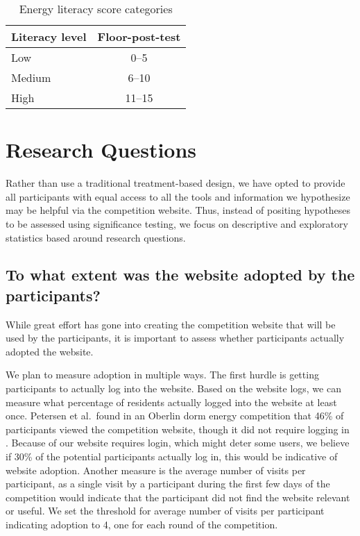 \begin{table}[htbp]
	\centering
		\begin{tabular}{| l | c |}
			\hline
			Literacy level & Floor-post-test \\ \hline
				
			Low & 0--5 \\ \hline

			Medium & 6--10 \\ \hline

			High & 11--15 \\ \hline

		\end{tabular}
	\caption{Energy literacy score categories}
	\label{tab:literacy-categories}
\end{table}


\section{Research Questions}

Rather than use a traditional treatment-based design, we have opted to provide all participants with equal access to all the tools and information we hypothesize may be helpful via the competition website. Thus, instead of positing hypotheses to be assessed using significance testing, we focus on descriptive and exploratory statistics based around research questions.

\subsection{To what extent was the website adopted by the participants?}
\label{sec:adoption}

While great effort has gone into creating the competition website that will be used by the participants, it is important to assess whether participants actually adopted the website.

We plan to measure adoption in multiple ways. The first hurdle is getting participants to actually log into the website. Based on the website logs, we can measure what percentage of residents actually logged into the website at least once. Petersen et al.\ found in an Oberlin dorm energy competition that 46\% of participants viewed the competition website, though it did not require logging in \cite{petersen-dorm-energy-reduction}. Because of our website requires login, which might deter some users, we believe if 30\% of the potential participants actually log in, this would be indicative of website adoption. Another measure is the average number of visits per participant, as a single visit by a participant during the first few days of the competition would indicate that the participant did not find the website relevant or useful. We set the threshold for average number of visits per participant indicating adoption to 4, one for each round of the competition.

